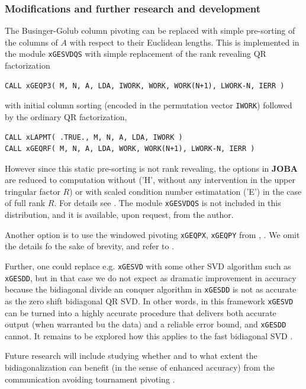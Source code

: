 \documentclass[12pt, a4paper, final]{article}
\numberwithin{equation}{section}
\begin{document}
\subsubsection{Modifications and further research and development} The Businger-Golub column pivoting can be replaced with simple pre-sorting of the columns of $A$ with respect to their Euclidean lengths. This is implemented in the module \texttt{xGESVDQS} with simple replacement of the rank revealing QR factorization
\begin{verbatim}
CALL xGEQP3( M, N, A, LDA, IWORK, WORK, WORK(N+1), LWORK-N, IERR )
\end{verbatim}
with initial column sorting (encoded in the permutation vector \texttt{IWORK}) followed by the ordinary QR factorization,
\begin{verbatim}
CALL xLAPMT( .TRUE., M, N, A, LDA, IWORK )
CALL xGEQRF( M, N, A, LDA, WORK, WORK(N+1), LWORK-N, IERR )
\end{verbatim}
However since this static pre-sorting is not rank revealing, the options in \textbf{JOBA} are reduced to computation without ('H', without any intervention in the upper tringular factor $R$) or with scaled condition number estimatation ('E') in the case of full rank $R$. For details see \cite{drm-xgesvd-paper}.  The module \texttt{xGESVDQS} is not included in this distribution, and it is available, upon request, from the author.  

Another option is to use the windowed pivoting \texttt{xGEQPX}, \texttt{xGEQPY} from
\cite{bischof-q-orti-RRQR-1998}, \cite{bischof-q-orti-RRQR-1998-TOMS782}. We omit the details fo the sake of brevity, and refer to \cite{drm-xgesvd-paper}.

Further, one could replace e.g. \texttt{xGESVD} with some other SVD algorithm such as \texttt{xGESDD}, but in that case we do not expect as dramatic improvement in accuracy because the bidiagonal divide an conquer algorithm in \texttt{xGESDD} is not as accurate as the zero shift bidiagonal QR SVD. In other words, in this framework \texttt{xGESVD} can be turned into a highly accurate procedure that delivers both accurate output (when warranted bu the data) and a reliable error bound, and \texttt{xGESDD} cannot. It remains to be explored how this applies to the fast bidiagonal SVD \cite{Grosser-Lang-2003}.

Future research will include studying whether and to what extent the bidiagonalization can benefit (in the sense of enhanced accuracy) from the communication avoiding tournament pivoting \cite{Demmel-CARRQR-15}.
\end{document}
